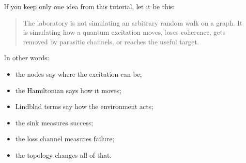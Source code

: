 \documentclass[11pt,a4paper]{article}
\begin{document}
If you keep only one idea from this tutorial, let it be this:
\begin{quote}
The laboratory is not simulating an arbitrary random walk on a graph. It is simulating how a quantum excitation moves, loses coherence, gets removed by parasitic channels, or reaches the useful target.
\end{quote}

In other words:
\begin{itemize}
  \item the nodes say where the excitation can be;
  \item the Hamiltonian says how it moves;
  \item Lindblad terms say how the environment acts;
  \item the sink measures success;
  \item the loss channel measures failure;
  \item the topology changes all of that.
\end{itemize}



\end{document}
